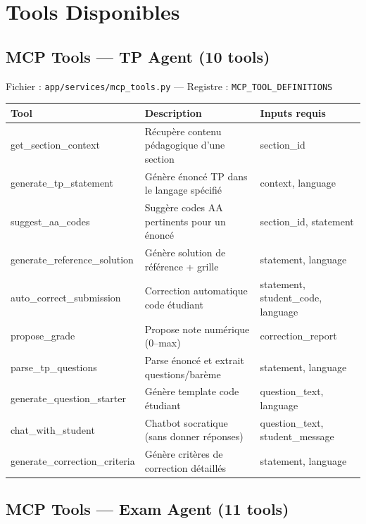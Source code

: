 \documentclass[12pt,a4paper]{article}
\begin{document}
\section{Tools Disponibles}

\subsection{MCP Tools --- TP Agent (10 tools)}

Fichier : \texttt{app/services/mcp\_tools.py} --- Registre : \texttt{MCP\_TOOL\_DEFINITIONS}

\begin{longtable}{lp{7cm}l}
\toprule
\textbf{Tool} & \textbf{Description} & \textbf{Inputs requis} \\
\midrule
get\_section\_context & Récupère contenu pédagogique d'une section & section\_id \\
generate\_tp\_statement & Génère énoncé TP dans le langage spécifié & context, language \\
suggest\_aa\_codes & Suggère codes AA pertinents pour un énoncé & section\_id, statement \\
generate\_reference\_solution & Génère solution de référence + grille & statement, language \\
auto\_correct\_submission & Correction automatique code étudiant & statement, student\_code, language \\
propose\_grade & Propose note numérique (0--max) & correction\_report \\
parse\_tp\_questions & Parse énoncé et extrait questions/barème & statement, language \\
generate\_question\_starter & Génère template code étudiant & question\_text, language \\
chat\_with\_student & Chatbot socratique (sans donner réponses) & question\_text, student\_message \\
generate\_correction\_criteria & Génère critères de correction détaillés & statement, language \\
\bottomrule
\end{longtable}

\subsection{MCP Tools --- Exam Agent (11 tools)}
\end{document}
